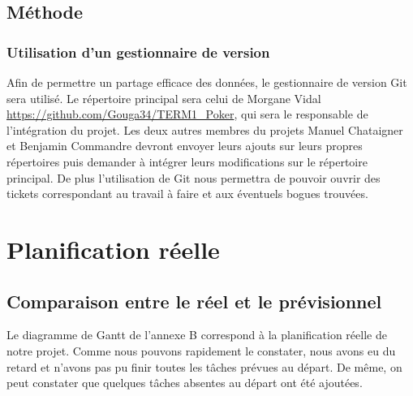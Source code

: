 \documentclass{report}
\begin{document}
\section{Méthode}
\subsection{Utilisation d'un gestionnaire de version}
\hspace{0.5cm}Afin de permettre un partage efficace des données, le gestionnaire de version Git sera utilisé. Le répertoire principal sera celui de Morgane Vidal \url{https://github.com/Gouga34/TERM1_Poker}, qui sera le responsable de l'intégration du projet. Les deux autres membres du projets Manuel Chataigner et Benjamin Commandre devront envoyer leurs ajouts sur leurs propres répertoires puis demander à intégrer leurs modifications sur le répertoire principal. De plus l'utilisation de Git nous permettra de pouvoir ouvrir des tickets correspondant au travail à faire et aux éventuels bogues trouvées.\par

\chapter{Planification réelle}
\section{Comparaison entre le réel et le prévisionnel}
\hspace{0.5cm}Le diagramme de Gantt de l'annexe B correspond à la planification réelle de notre projet. Comme nous pouvons rapidement le constater, nous avons eu du retard et n'avons pas pu finir toutes les tâches prévues au départ. De même, on peut constater que quelques tâches absentes au départ ont été ajoutées.\par
\end{document}
